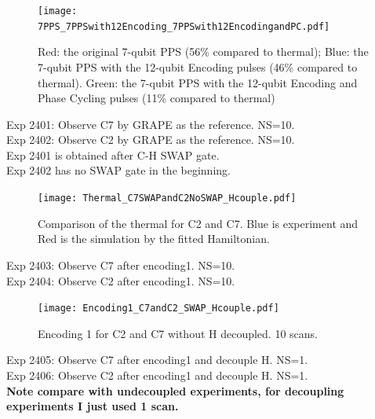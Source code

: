 \begin{figure}[htb]
\begin{center}
\texttt{[image: 7PPS\_7PPSwith12Encoding\_7PPSwith12EncodingandPC.pdf]}
\end{center}
\setlength{\abovecaptionskip}{-0.35cm}
\caption{\footnotesize{Red: the original 7-qubit PPS (56\% compared to thermal); Blue: the 7-qubit PPS with the 12-qubit Encoding pulses (46\% compared to thermal). Green: the 7-qubit PPS with the 12-qubit Encoding and Phase Cycling pulses (11\% compared to thermal)}}\label{1889and1891and1893}
\end{figure} 

\clearpage
Exp 2401: Observe C7 by GRAPE as the reference. NS=10.\\
Exp 2402: Observe C2 by GRAPE as the reference. NS=10. \\

Exp 2401 is obtained after C-H SWAP gate.\\
Exp 2402 has no SWAP gate in the beginning.\\

\begin{figure}[htb]
\begin{center}
\texttt{[image: Thermal\_C7SWAPandC2NoSWAP\_Hcouple.pdf]}
\end{center}
\setlength{\abovecaptionskip}{-0.35cm}
\caption{\footnotesize{Comparison of the thermal for C2 and C7. Blue is experiment and Red is the simulation by the fitted Hamiltonian.}}\label{2401and2402}
\end{figure}

\clearpage
Exp 2403: Observe C7 after encoding1. NS=10.\\
Exp 2404: Observe C2 after encoding1. NS=10.\\

\begin{figure}[htb]
\begin{center}
\texttt{[image: Encoding1\_C7andC2\_SWAP\_Hcouple.pdf]}
\end{center}
\setlength{\abovecaptionskip}{-0.35cm}
\caption{\footnotesize{Encoding 1 for C2 and C7 without H decoupled. 10 scans.}}\label{2403and2404}
\end{figure}

\clearpage
Exp 2405: Observe C7 after encoding1 and decouple H. NS=1.\\
Exp 2406: Observe C2 after encoding1 and decouple H. NS=1.\\
\textbf{Note compare with undecoupled experiments, for decoupling experiments I just used 1 scan.}

